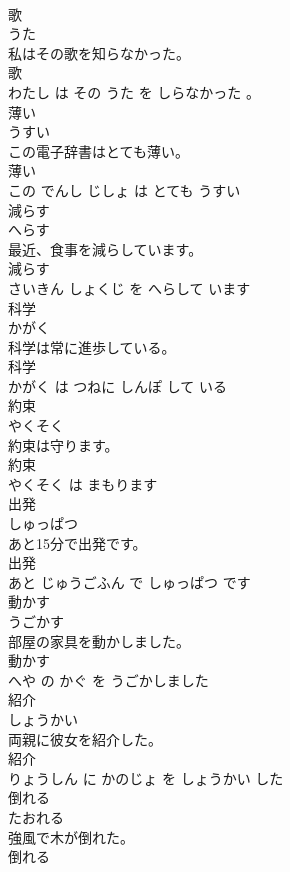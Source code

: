 \documentclass[8pt]{extreport}
\begin{document}
\begin{CJK}{UTF8}{min}
\\	歌	
\\	うた			
\\	私はその歌を知らなかった。	
\\	歌 
\\	わたし は その うた を しらなかった 。			
\\	薄い	
\\	うすい			
\\	この電子辞書はとても薄い。	
\\	薄い 
\\	この でんし じしょ は とても うすい			
\\	減らす	
\\	へらす			
\\	最近、食事を減らしています。	
\\	減らす 
\\	さいきん しょくじ を へらして います			
\\	科学	
\\	かがく			
\\	科学は常に進歩している。	
\\	科学 
\\	かがく は つねに しんぽ して いる			
\\	約束	
\\	やくそく			
\\	約束は守ります。	
\\	約束 
\\	やくそく は まもります			
\\	出発	
\\	しゅっぱつ			
\\	あと15分で出発です。	
\\	出発 
\\	あと じゅうごふん で しゅっぱつ です			
\\	動かす	
\\	うごかす			
\\	部屋の家具を動かしました。	
\\	動かす 
\\	へや の かぐ を うごかしました			
\\	紹介	
\\	しょうかい			
\\	両親に彼女を紹介した。	
\\	紹介 
\\	りょうしん に かのじょ を しょうかい した			
\\	倒れる	
\\	たおれる			
\\	強風で木が倒れた。	
\\	倒れる 

\end{CJK}
\end{document}
